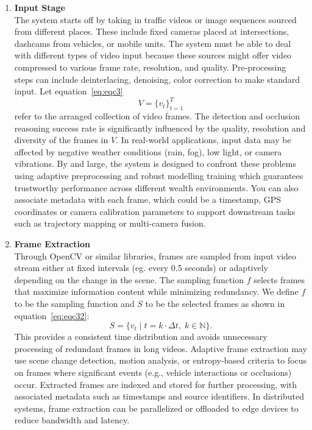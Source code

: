 \documentclass[12pt,a4paper]{report}
\theoremstyle{definition}
\theoremstyle{remark}
\begin{document}
\begin{enumerate}

    \item \textbf{Input Stage}\\
    The system starts off by taking in traffic videos or image sequences sourced from different places. These include fixed cameras placed at intersections, dashcams from vehicles, or mobile units. The system must be able to deal with different types of video input because these sources might offer video compressed to various frame rate, resolution, and quality. Pre-processing steps can include deinterlacing, denoising, color correction to make standard input. Let equation~\ref{eq:eqc3}
    \begin{equation}
    \label{eq:eqc3}
    V = \{v_t\}_{t=1}^{T}
    \end{equation}
    refer to the arranged collection of video frames. The detection and occlusion reasoning success rate is significantly influenced by the quality, resolution and diversity of the frames in $V$. In real-world applications, input data may be affected by negative weather conditions (rain, fog), low light, or camera vibrations. By and large, the system is designed to confront these problems using adaptive preprocessing and robust modelling training which guarantees trustworthy performance across different wealth environments. You can also associate metadata with each frame, which could be a timestamp, GPS coordinates or camera calibration parameters to support downstream tasks such as trajectory mapping or multi-camera fusion.

    \item \textbf{Frame Extraction}\\
    Through OpenCV or similar libraries, frames are sampled from input video stream either at fixed intervals (eg. every 0.5 seconds) or adaptively depending on the change in the scene. The sampling function $f$ selects frames that maximize information content while minimizing redundancy. We define $f$ to be the sampling function and $S$ to be the selected frames as shown in equation~\ref{eq:eqc32}:
    \begin{equation}
    \label{eq:eqc32}
    S = \{v_t \mid t = k \cdot \Delta t,\; k \in \mathbb{N}\}.
    \end{equation}
    This provides a consistent time distribution and avoids unnecessary processing of redundant frames in long videos. Adaptive frame extraction may use scene change detection, motion analysis, or entropy-based criteria to focus on frames where significant events (e.g., vehicle interactions or occlusions) occur. Extracted frames are indexed and stored for further processing, with associated metadata such as timestamps and source identifiers. In distributed systems, frame extraction can be parallelized or offloaded to edge devices to reduce bandwidth and latency.


\end{enumerate}
\end{document}

